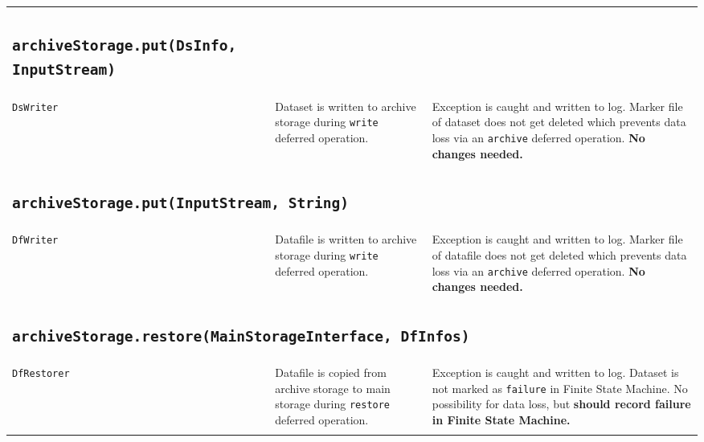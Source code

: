 \documentclass[paper=a4]{scrartcl}
\begin{document}
\begin{longtable}{ p{32mm} | p{48mm} | p{48mm} }
{      \subsection{\texttt{archiveStorage.put(DsInfo, InputStream)}}
    } \\

    \raggedright \texttt{DsWriter} &
    \raggedright Dataset is written to archive storage during \texttt{write} deferred operation. &
    \raggedright Exception is caught and written to log. Marker file of dataset does not get deleted which prevents data loss via an \texttt{archive} deferred operation. \textbf{No changes needed.}
    \tabularnewline

    \multicolumn{3}{p{\textwidth}}{
      \subsection{\texttt{archiveStorage.put(InputStream, String)}}
    } \\

    \raggedright \texttt{DfWriter} &
    \raggedright Datafile is written to archive storage during \texttt{write} deferred operation. &
    \raggedright Exception is caught and written to log. Marker file of datafile does not get deleted which prevents data loss via an \texttt{archive} deferred operation. \textbf{No changes needed.}
    \tabularnewline

    \multicolumn{3}{p{\textwidth}}{
      \subsection{\texttt{archiveStorage.restore(MainStorageInterface, DfInfos)}}
    } \\

    \raggedright \texttt{DfRestorer} &
    \raggedright Datafile is copied from archive storage to main storage during \texttt{restore} deferred operation. &
    \raggedright Exception is caught and written to log. Dataset is not marked as \texttt{failure} in Finite State Machine. No possibility for data loss, but \textbf{should record failure in Finite State Machine.}
    \tabularnewline

    \pagebreak

    \multicolumn{3}{p{\textwidth}}{
      \subsection{\texttt{mainStorage.delete(DsInfo)}}
    } \\


\end{longtable}
\end{document}
